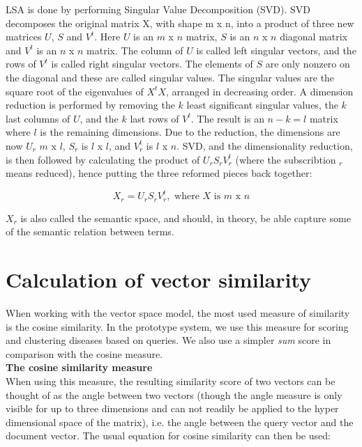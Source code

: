 LSA is done by performing Singular Value Decomposition (SVD). SVD
decomposes the original matrix X, with shape m x n, into a product of
three new matrices $U$, $S$ and $V^{t}$. Here $U$ is an $m$ x $n$ matrix, $S$ is
an $n$ x $n$ diagonal matrix and $V^{t}$ is an $n$ x $n$ matrix. The column of
$U$ is called left singular vectors, and the rows of $V^{t}$ is called
right singular vectors. The elements of $S$ are only nonzero on the
diagonal and these are called singular values. The singular values are
the square root of the eigenvalues of $X^{t}X$, arranged in decreasing
order. A dimension reduction is performed by removing the $k$ least
significant singular values, the $k$ last columns of $U$, and the $k$ last
rows of $V^{t}$. The result is an $n - k = l$ matrix where $l$ is the
remaining dimensions. Due to the reduction, the dimensions are now
$U_{r}$ $m$ x $l$, $S_{r}$ is $l$ x $l$, and $V_{r}^{t}$ is $l$ x $n$. SVD, and the
dimensionality reduction, is then followed by calculating the product
of $U_{r}S_{r}V_{r}^{t}$ (where the subscribtion $_{r}$ means reduced),
hence putting the three reformed pieces back together: 

\[
X_{r} = U_{r}S_{r}V_{r}^{t}, \textrm{ where } X \textrm{ is } m \textrm{ x }n
\]

$X_{r}$ is also called the semantic space, and should, in theory, be
able capture some of the semantic relation between terms.

\section{Calculation of vector similarity\label{VectorSimilarity}}

When working with the vector space model, the most used measure of
similarity is the cosine similarity. In the prototype system, we use
this measure for scoring and clustering diseases based on queries. We
also use a simpler \textit{sum} score in comparison with the cosine
measure.\\

\textbf{The cosine similarity measure} \\ 
When using this measure, the resulting similarity score of two vectors
can be thought of as the angle between two vectors (though the angle
measure is only visible for up to three dimensions and can not readily
be applied to the hyper dimensional space of the matrix), i.e. the
angle between the query vector and the document vector. The usual
equation for cosine similarity can then be used:


